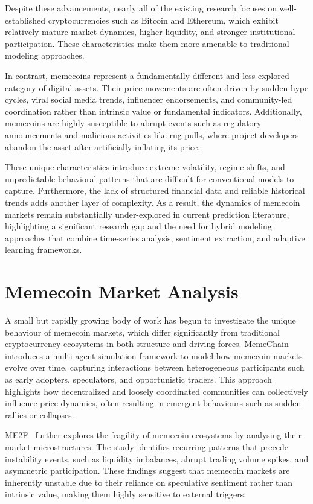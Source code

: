 \documentclass[12pt,a4paper,oneside,openany]{book}
\begin{document}
Despite these advancements, nearly all of the existing research focuses on well-established cryptocurrencies such as Bitcoin and Ethereum, which exhibit relatively mature market dynamics, higher liquidity, and stronger institutional participation. These characteristics make them more amenable to traditional modeling approaches.

In contrast, memecoins represent a fundamentally different and less-explored category of digital assets. Their price movements are often driven by sudden hype cycles, viral social media trends, influencer endorsements, and community-led coordination rather than intrinsic value or fundamental indicators. Additionally, memecoins are highly susceptible to abrupt events such as regulatory announcements and malicious activities like rug pulls, where project developers abandon the asset after artificially inflating its price.

These unique characteristics introduce extreme volatility, regime shifts, and unpredictable behavioral patterns that are difficult for conventional models to capture. Furthermore, the lack of structured financial data and reliable historical trends adds another layer of complexity. As a result, the dynamics of memecoin markets remain substantially under-explored in current prediction literature, highlighting a significant research gap and the need for hybrid modeling approaches that combine time-series analysis, sentiment extraction, and adaptive learning frameworks.

\section{Memecoin Market Analysis}
A small but rapidly growing body of work has begun to investigate the unique behaviour of memecoin markets, which differ significantly from traditional cryptocurrency ecosystems in both structure and driving forces. MemeChain~\cite{ref1} introduces a multi-agent simulation framework to model how memecoin markets evolve over time, capturing interactions between heterogeneous participants such as early adopters, speculators, and opportunistic traders. This approach highlights how decentralized and loosely coordinated communities can collectively influence price dynamics, often resulting in emergent behaviours such as sudden rallies or collapses.

ME2F~\cite{ref2} further explores the fragility of memecoin ecosystems by analysing their market microstructures. The study identifies recurring patterns that precede instability events, such as liquidity imbalances, abrupt trading volume spikes, and asymmetric participation. These findings suggest that memecoin markets are inherently unstable due to their reliance on speculative sentiment rather than intrinsic value, making them highly sensitive to external triggers.
\end{document}
